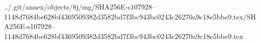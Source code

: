 ../.git/annex/objects/8j/mg/SHA256E-s107928--1148d7684be628bf4369509382d3582bd7f3bc943bc0243c26270a9c18e5bbe9.tex/SHA256E-s107928--1148d7684be628bf4369509382d3582bd7f3bc943bc0243c26270a9c18e5bbe9.tex
